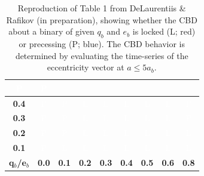 \documentclass[fleqn,usenatbib]{mnras}
\begin{document}
\begin{table}
\begin{tabular}{|c|c|c|c|c|c|c|c|c|}
    \cellcolor{blue}\textcolor{white}{P} & \cellcolor{blue}\textcolor{white}{P} \\ 
    \hline
    \textbf{0.4} & 
    \cellcolor{blue}\textcolor{white}{P} & 
    \cellcolor{blue}\textcolor{white}{P} & 
    \cellcolor{red}\textcolor{white}{L} & 
    \cellcolor{red}\textcolor{white}{L} & 
    \cellcolor{red}\textcolor{white}{L} & 
    \cellcolor{red}\textcolor{white}{L} & 
    \cellcolor{red}\textcolor{white}{L} & 
    \cellcolor{blue}\textcolor{white}{P} \\ 
    \hline
    \textbf{0.3} & 
    \cellcolor{blue}\textcolor{white}{P} & 
    \cellcolor{blue}\textcolor{white}{P} & 
    \cellcolor{red}\textcolor{white}{L} & 
    \cellcolor{red}\textcolor{white}{L} & 
    \cellcolor{red}\textcolor{white}{L} & 
    \cellcolor{red}\textcolor{white}{L} & 
    \cellcolor{red}\textcolor{white}{L} & 
    \cellcolor{blue}\textcolor{white}{P} \\ 
    \hline
    \textbf{0.2} & 
    \cellcolor{blue}\textcolor{white}{P} & 
    \cellcolor{blue}\textcolor{white}{P} & 
    \cellcolor{red}\textcolor{white}{L} & 
    \cellcolor{red}\textcolor{white}{L} & 
    \cellcolor{red}\textcolor{white}{L} & 
    \cellcolor{red}\textcolor{white}{L} & 
    \cellcolor{red}\textcolor{white}{L} & 
    \cellcolor{red}\textcolor{white}{L} \\ 
    \hline
    \textbf{0.1} & 
    \cellcolor{blue}\textcolor{white}{P} & 
    \cellcolor{red}\textcolor{white}{L} & 
    \cellcolor{red}\textcolor{white}{L} & 
    \cellcolor{red}\textcolor{white}{L} & 
    \cellcolor{red}\textcolor{white}{L} & 
    \cellcolor{red}\textcolor{white}{L} & 
    \cellcolor{red}\textcolor{white}{L} & 
    \cellcolor{red}\textcolor{white}{L} \\ 
    \hline
    \multicolumn{1}{|c|}{\textbf{q$_b$/e$_b$}} & \textbf{0.0} & \textbf{0.1} & \textbf{0.2} & \textbf{0.3} & \textbf{0.4} & \textbf{0.5} & \textbf{0.6} & \textbf{0.8} \\
    \hline
\end{tabular}
\caption{Reproduction of Table 1 from DeLaurentiis \& Rafikov (in preparation), showing whether the CBD about a binary of given $q_b$ and $e_b$ is locked (L; red) or precessing (P; blue). The CBD behavior is determined by evaluating the time-series of the eccentricity vector at $a\leq 5a_b$.}
\label{tab:locked_precessing_grid}
\end{table}
\end{document}
